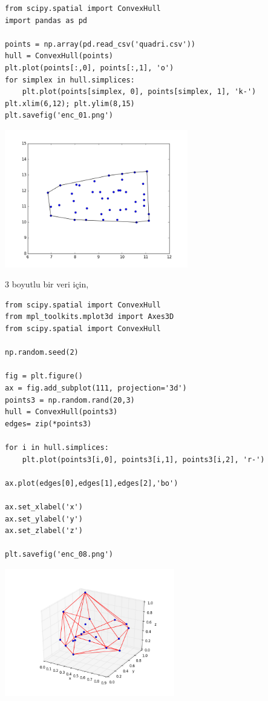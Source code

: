 \documentclass[12pt,fleqn]{article}\usepackage{../../common}
\begin{document}
\begin{verbatim}
from scipy.spatial import ConvexHull
import pandas as pd

points = np.array(pd.read_csv('quadri.csv'))
hull = ConvexHull(points)
plt.plot(points[:,0], points[:,1], 'o')
for simplex in hull.simplices:
    plt.plot(points[simplex, 0], points[simplex, 1], 'k-')
plt.xlim(6,12); plt.ylim(8,15)
plt.savefig('enc_01.png')
\end{verbatim}

\includegraphics[height=6cm]{enc_01.png}

3 boyutlu bir veri için,

\begin{verbatim}
from scipy.spatial import ConvexHull
from mpl_toolkits.mplot3d import Axes3D
from scipy.spatial import ConvexHull

np.random.seed(2)

fig = plt.figure()
ax = fig.add_subplot(111, projection='3d')
points3 = np.random.rand(20,3)
hull = ConvexHull(points3)
edges= zip(*points3)

for i in hull.simplices:
    plt.plot(points3[i,0], points3[i,1], points3[i,2], 'r-')

ax.plot(edges[0],edges[1],edges[2],'bo')

ax.set_xlabel('x')
ax.set_ylabel('y')
ax.set_zlabel('z')

plt.savefig('enc_08.png')
\end{verbatim}

\includegraphics[width=20em]{enc_08.png}
\end{document}
